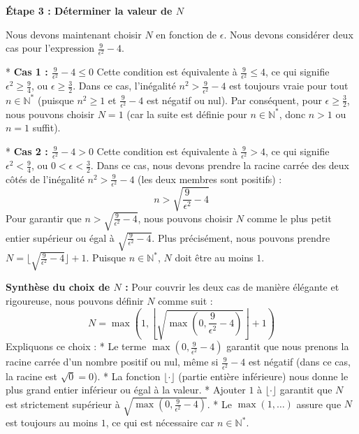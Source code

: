 \documentclass[a4paper,11pt]{report}
\begin{document}
\textbf{Étape 3 : Déterminer la valeur de $N$}

Nous devons maintenant choisir $N$ en fonction de $\epsilon$. Nous devons considérer deux cas pour l'expression $\frac{9}{\epsilon^2} - 4$.

*   \textbf{Cas 1 : $\frac{9}{\epsilon^2} - 4 \le 0$}
    Cette condition est équivalente à $\frac{9}{\epsilon^2} \le 4$, ce qui signifie $\epsilon^2 \ge \frac{9}{4}$, ou $\epsilon \ge \frac{3}{2}$.
    Dans ce cas, l'inégalité $n^2 > \frac{9}{\epsilon^2} - 4$ est toujours vraie pour tout $n \in \mathbb{N}^*$ (puisque $n^2 \ge 1$ et $\frac{9}{\epsilon^2} - 4$ est négatif ou nul).
    Par conséquent, pour $\epsilon \ge \frac{3}{2}$, nous pouvons choisir $N=1$ (car la suite est définie pour $n \in \mathbb{N}^*$, donc $n > 1$ ou $n=1$ suffit).

*   \textbf{Cas 2 : $\frac{9}{\epsilon^2} - 4 > 0$}
    Cette condition est équivalente à $\frac{9}{\epsilon^2} > 4$, ce qui signifie $\epsilon^2 < \frac{9}{4}$, ou $0 < \epsilon < \frac{3}{2}$.
    Dans ce cas, nous devons prendre la racine carrée des deux côtés de l'inégalité $n^2 > \frac{9}{\epsilon^2} - 4$ (les deux membres sont positifs) :
    $$n > \sqrt{\frac{9}{\epsilon^2} - 4}$$
    Pour garantir que $n > \sqrt{\frac{9}{\epsilon^2} - 4}$, nous pouvons choisir $N$ comme le plus petit entier supérieur ou égal à $\sqrt{\frac{9}{\epsilon^2} - 4}$. Plus précisément, nous pouvons prendre $N = \lfloor \sqrt{\frac{9}{\epsilon^2} - 4} \rfloor + 1$.
    Puisque $n \in \mathbb{N}^*$, $N$ doit être au moins $1$.

\textbf{Synthèse du choix de $N$ :}
Pour couvrir les deux cas de manière élégante et rigoureuse, nous pouvons définir $N$ comme suit :
$$N = \max\left(1, \left\lfloor \sqrt{\max\left(0, \frac{9}{\epsilon^2} - 4\right)} \right\rfloor + 1\right)$$
Expliquons ce choix :
*   Le terme $\max\left(0, \frac{9}{\epsilon^2} - 4\right)$ garantit que nous prenons la racine carrée d'un nombre positif ou nul, même si $\frac{9}{\epsilon^2} - 4$ est négatif (dans ce cas, la racine est $\sqrt{0}=0$).
*   La fonction $\lfloor \cdot \rfloor$ (partie entière inférieure) nous donne le plus grand entier inférieur ou égal à la valeur.
*   Ajouter $1$ à $\lfloor \cdot \rfloor$ garantit que $N$ est strictement supérieur à $\sqrt{\max\left(0, \frac{9}{\epsilon^2} - 4\right)}$.
*   Le $\max(1, \dots)$ assure que $N$ est toujours au moins $1$, ce qui est nécessaire car $n \in \mathbb{N}^*$.
\end{document}
